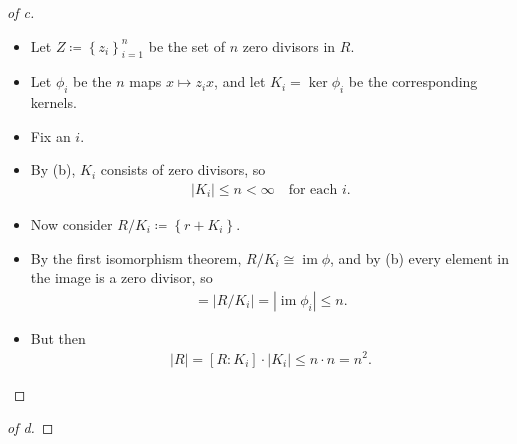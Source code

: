 \begin{solution}
\begin{proof}[of c]
\begin{itemize}
\item
  Let \(Z \coloneqq\left\{{z_i}\right\}_{i=1}^n\) be the set of \(n\)
  zero divisors in \(R\).
\item
  Let \(\phi_i\) be the \(n\) maps \(x \mapsto z_i x\), and let
  \(K_i = \ker \phi_i\) be the corresponding kernels.
\item
  Fix an \(i\).
\item
  By (b), \(K_i\) consists of zero divisors, so
  \begin{align*}
  {\left\lvert {K_i} \right\rvert} \leq n < \infty \quad \text{for each } i
  .\end{align*}
\item
  Now consider \(R/K_i \coloneqq\left\{{r + K_i}\right\}\).
\item
  By the first isomorphism theorem,
  \(R/K_i \cong \operatorname{im}\phi\), and by (b) every element in the
  image is a zero divisor, so
  \begin{align*}
  [R: K_i] = {\left\lvert {R/K_i} \right\rvert} = {\left\lvert {\operatorname{im}\phi_i} \right\rvert} \leq n 
  .\end{align*}
\item
  But then
  \begin{align*}
  {\left\lvert {R} \right\rvert} = [R:K_i]\cdot {\left\lvert {K_i} \right\rvert} \leq n\cdot n = n^2 
  .\end{align*}
\end{itemize}

\end{proof}

\begin{proof}[of d]

\envlist


\end{proof}
\end{solution}
